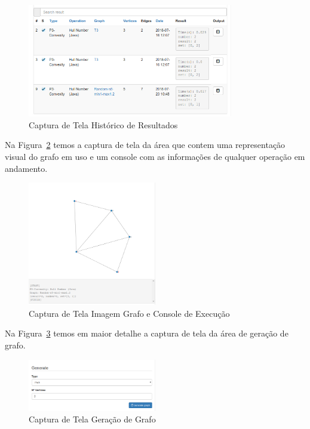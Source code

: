 \begin{figure}[h]
	\begin{center}
	    \includegraphics[width=0.8\textwidth]{./imagens/ferramenta-resultado.png}
	\end{center}
	\caption{Captura de Tela Histórico de Resultados}
    \label{fig-ferramenta-grafo-tabela-resultados}
\end{figure}

Na Figura~\ref{fig-ferramenta-grafo-console} temos a captura de tela da área que contem uma representação visual do grafo em uso e um console com as informações de qualquer operação em andamento.

\begin{figure}[H]
\begin{center}
\includegraphics[width=0.5\textwidth]{./imagens/ferramenta-resultado-console.png}
\end{center}
\caption{Captura de Tela Imagem Grafo e Console de Execução}
\label{fig-ferramenta-grafo-console}
\end{figure}


Na Figura~\ref{fig-ferramenta-area-gerador} temos em maior detalhe a captura de tela da área de geração de grafo.

\begin{figure}[H]
	\begin{center}
	    \includegraphics[width=0.5\textwidth]{./imagens/ferramenta-area-gerador.png}
	\end{center}
	\caption{Captura de Tela Geração de Grafo}
    \label{fig-ferramenta-area-gerador}
\end{figure}

